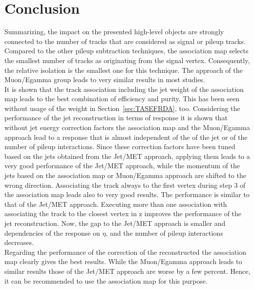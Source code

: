 \section{Conclusion}

Summarizing, the impact on the presented high-level objects are strongly connected to the number of tracks that are considered as signal or pileup tracks. Compared to the other pileup subtraction techniques, the association map selects the smallest number of tracks as originating from the signal vertex. Consequently, the relative isolation is the smallest one for this technique. The approach of the Muon/Egamma group leads to very similar results in most studies. \\
It is shown that the track association including the jet weight of the association map leads to the best combination of efficiency and purity. This has been seen without usage of the weight in Section~\ref{sec:TASEFRDA}, too. Considering the performance of the jet reconstruction in terms of \pt{} response it is shown that without jet energy correction factors the association map and the Muon/Egamma approach lead to a \pt{} response that is almost independent of the \pt{} of the jet or of the number of pileup interactions. Since these correction factors have been tuned based on the jets obtained from the Jet/MET approach, applying them leads to a very good performance of the Jet/MET approach, while the momentum of the jets based on the association map or Muon/Egamma approach are shifted to the wrong direction. Associating the track always to the first vertex during step 3 of the association map leads also to very good results. The performance is similar to that of the Jet/MET approach. Executing more than one association with associating the track to the closest vertex in z improves the performance of the jet reconstruction. Now, the gap to the Jet/MET approach is smaller and dependencies of the \pt{} response on $\eta{}$, \pt{} and the number of pileup interactions decreases.  \\
Regarding the performance of the correction of the reconstructed \MET{} the association map clearly gives the best results. While the Muon/Egamma approach leads to similar results those of the Jet/MET approach are worse by a few percent. Hence, it can be recommended to use the association map for this purpose.\\
